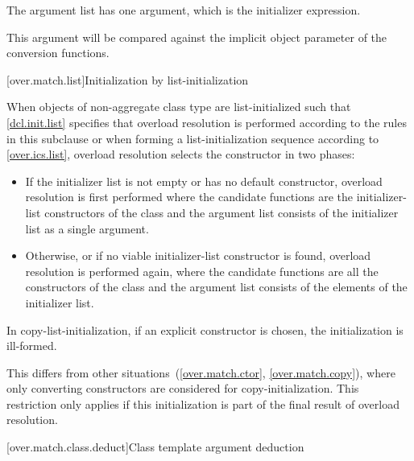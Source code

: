 \pnum
The argument list has one argument, which is the initializer expression.
\begin{note}
This argument will be compared against
the implicit object parameter of the conversion functions.
\end{note}

[over.match.list]{Initialization by list-initialization}%

\pnum
When objects of non-aggregate class type  are
list-initialized such that \ref{dcl.init.list} specifies that overload resolution
is performed according to the rules in this subclause
or when forming a list-initialization sequence according to \ref{over.ics.list},
overload resolution selects the constructor in two phases:
\begin{itemize}
\item
If the initializer list is not empty or  has no default constructor,
overload resolution is first performed
where the candidate functions are the initializer-list constructors
of the class  and
the argument list consists of the initializer list as a single argument.

\item
Otherwise, or if no viable initializer-list constructor is found,
overload resolution is
performed again, where the candidate functions are all the constructors of
the class  and
the argument list consists of the elements of the initializer list.
\end{itemize}

In copy-list-initialization, if an explicit constructor is
chosen, the initialization is ill-formed.
\begin{note}
This differs from other situations~(\ref{over.match.ctor}, \ref{over.match.copy}),
where only converting constructors are considered for copy-initialization.
This restriction only
applies if this initialization is part of the final result of overload
resolution.
\end{note}

[over.match.class.deduct]{Class template argument deduction}%
%

